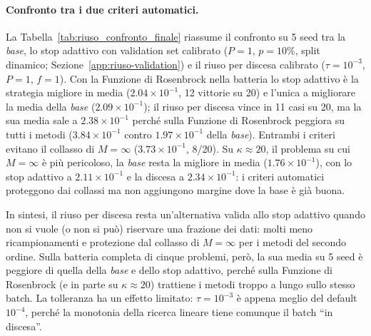 \documentclass[a4paper,12pt]{article}
\numberwithin{equation}{section}
\numberwithin{figure}{section}
\numberwithin{table}{section}
\begin{document}
\paragraph{Confronto tra i due criteri automatici.}
La Tabella~\ref{tab:riuso_confronto_finale} riassume il confronto su 5 seed
tra la \emph{base}, lo stop adattivo con validation set calibrato ($P=1$,
$p=10\%$, split dinamico; Sezione~\ref{app:riuso-validation}) e il riuso per
discesa calibrato ($\tau=10^{-3}$, $P=1$, $f=1$). Con la Funzione di Rosenbrock nella batteria
lo stop adattivo è la strategia migliore in media
($2.04\times10^{-1}$, 12 vittorie su 20) e l'unica a migliorare la media
della \emph{base} ($2.09\times10^{-1}$); il riuso per discesa vince in 11 casi
su 20, ma la sua media sale a $2.38\times10^{-1}$ perché sulla Funzione di Rosenbrock peggiora
su tutti i metodi ($3.84\times10^{-1}$ contro $1.97\times10^{-1}$ della
\emph{base}). Entrambi i criteri evitano il collasso di $M=\infty$
($3.73\times10^{-1}$, 8/20). Su $\kappa\approx20$, il problema su cui
$M=\infty$ è più pericoloso, la \emph{base} resta la migliore in media
($1.76\times10^{-1}$), con lo stop adattivo a $2.11\times10^{-1}$ e la discesa
a $2.34\times10^{-1}$: i criteri automatici proteggono dai collassi ma non
aggiungono margine dove la base è già buona.

In sintesi, il riuso per discesa resta un'alternativa valida allo stop
adattivo quando non si vuole (o non si può) riservare una frazione dei dati:
molti meno ricampionamenti e protezione dal collasso di $M=\infty$ per i
metodi del secondo ordine. Sulla batteria completa di cinque problemi, però,
la sua media su 5 seed è peggiore di quella della \emph{base} e dello stop
adattivo, perché sulla Funzione di Rosenbrock (e in parte su $\kappa\approx20$) trattiene i
metodi troppo a lungo sullo stesso batch. La tolleranza ha un effetto
limitato: $\tau=10^{-3}$ è appena meglio del default $10^{-4}$, perché la
monotonia della ricerca lineare tiene comunque il batch ``in discesa''.
\end{document}
